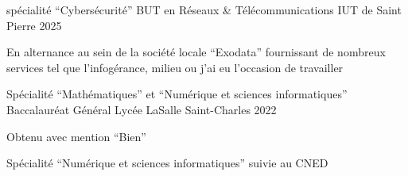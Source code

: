 
\begin{cventries}

  \cventry
    {spécialité ``Cybersécurité''}
    {BUT en Réseaux \& Télécommunications}
    {IUT de Saint Pierre}
    {2025}
    {
      \begin{cvitems}
        \item {En alternance au sein de la société locale ``Exodata'' fournissant de nombreux services tel que l'infogérance, milieu ou j'ai eu l'occasion de travailler}
      \end{cvitems}
    }

  \cventry
    {Spécialité ``Mathématiques'' et ``Numérique et sciences informatiques''}
    {Baccalauréat Général}
    {Lycée LaSalle Saint-Charles}
    {2022}
    {
      \begin{cvitems}
        \item {Obtenu avec mention ``Bien''}
        \item {Spécialité ``Numérique et sciences informatiques'' suivie au CNED}
      \end{cvitems}
    }

\end{cventries}
